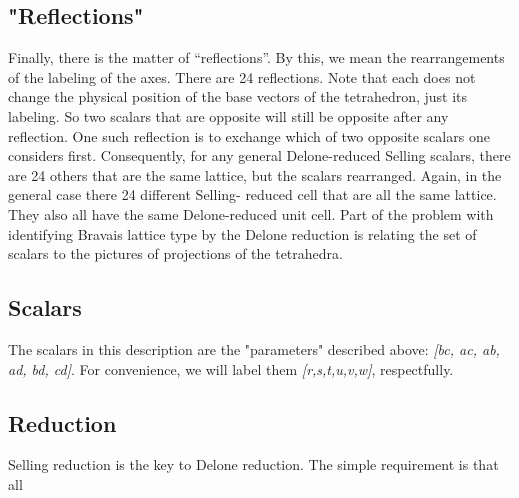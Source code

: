 \documentclass[11pt]{article} %
\begin{document}
\subsection{"Reflections"}
Finally, there is the matter of ``reflections''. By this, we mean the rearrangements of the labeling of the axes. There are 24 reflections. Note that each does not change the physical position of the base vectors of the tetrahedron, just its labeling. So two scalars that are opposite will still be opposite after any reflection. One such reflection is to exchange which of two opposite scalars one considers first. Consequently, for any general Delone-reduced Selling scalars, there are 24 others that are the same lattice, but the scalars rearranged. Again, in the general case there 24 different Selling- reduced cell that are all the same lattice. They also all have the same Delone-reduced unit cell. Part of the problem with identifying Bravais lattice type by the Delone reduction is relating the set of scalars to the pictures of projections of the tetrahedra.

\subsection{Scalars}

The scalars in this description are the "parameters" described above: \textit{[b{\textbullet}c, a{\textbullet}c, a{\textbullet}b, a{\textbullet}d, b{\textbullet}d, c{\textbullet}d]}. For convenience, we will label them \textit{[r,s,t,u,v,w]}, respectfully.

\subsection{Reduction}

Selling reduction is the key to Delone reduction. The simple requirement is that all 



\end{document}
